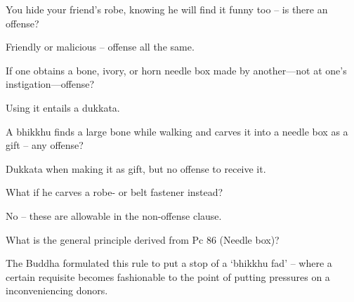 \bigskip

You hide your friend's robe, knowing he will find it funny too – is there an offense?

\bigskip

\begin{solution}
  Friendly or malicious – offense all the same.
\end{solution}


If one obtains a bone, ivory, or horn needle box made by another—not at one’s instigation—offense?

\begin{solution}
  Using it entails a dukkata. 
\end{solution}

\bigskip

A bhikkhu finds a large bone while walking and carves it into a needle box as a gift – any offense?

\begin{solution}
  Dukkata when making it as gift, but no offense to receive it.
\end{solution}

\bigskip

What if he carves a robe- or belt fastener instead?

\begin{solution}
  No – these are allowable in the non-offense clause. 
\end{solution}

\bigskip

What is the general principle derived from Pc 86 (Needle box)?

\begin{solution}
  The Buddha formulated this rule to put a stop of a ‘bhikkhu fad’ – where a
  certain requisite becomes fashionable to the point of putting pressures on a
  inconveniencing donors.
\end{solution}
